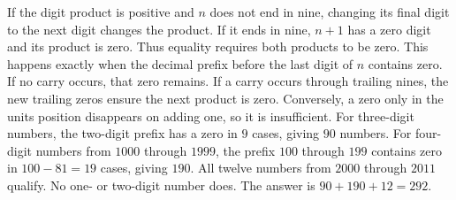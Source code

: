 If the digit product is positive and $n$ does not end in nine, changing its final digit to the next digit changes the product. If it ends in nine, $n+1$ has a zero digit and its product is zero. Thus equality requires both products to be zero.
This happens exactly when the decimal prefix before the last digit of $n$ contains zero. If no carry occurs, that zero remains. If a carry occurs through trailing nines, the new trailing zeros ensure the next product is zero. Conversely, a zero only in the units position disappears on adding one, so it is insufficient.
For three-digit numbers, the two-digit prefix has a zero in $9$ cases, giving $90$ numbers. For four-digit numbers from $1000$ through $1999$, the prefix $100$ through $199$ contains zero in $100-81=19$ cases, giving $190$. All twelve numbers from $2000$ through $2011$ qualify. No one- or two-digit number does. The answer is $\boxed{90+190+12=292}$.
